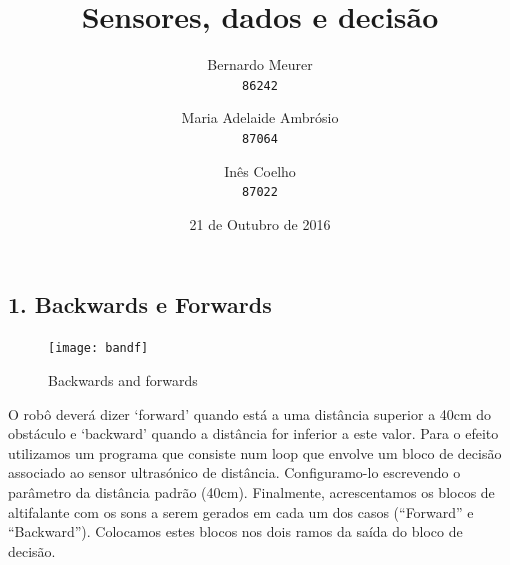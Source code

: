 \documentclass{article}
\title{Sensores, dados e decisão}
\date{21 de Outubro de 2016}
\author{Bernardo Meurer\\
        \texttt{86242}
        \and
        Maria Adelaide Ambrósio\\
        \texttt{87064}
        \and
        Inês Coelho\\
        \texttt{87022}}
\begin{document}
\maketitle
\newpage

\subsection*{1. Backwards e Forwards}
\begin{figure}
    \centering
    \texttt{[image: bandf]}
    \caption{Backwards and forwards}
\end{figure}
O robô deverá dizer `forward' quando está a uma distância superior a 40cm do
obstáculo e `backward' quando a distância for inferior a este valor. Para o
efeito utilizamos um programa que consiste num loop que envolve um bloco de
decisão associado ao sensor ultrasónico de distância. Configuramo-lo escrevendo
o parâmetro da distância padrão (40cm). Finalmente, acrescentamos os blocos
de altifalante com os sons a serem gerados em cada um dos casos (“Forward” e
“Backward”). Colocamos estes blocos nos dois ramos da saída do bloco de decisão.
\newline
\end{document}
